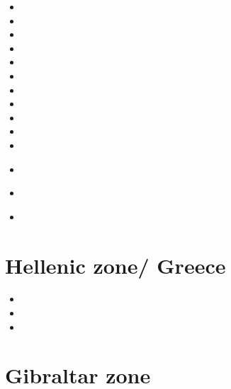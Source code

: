 \begin{scriptsize}
\begin{itemize}
\item[\nineteeneightyeight] 
\item[\nineteenninetysix] 
\item[\nineteenninetyeight] 
\item[\nineteenninetynine] 
\item[\twothousand] 
\item[\twothousandthree] 
\item[\twothousandfour] 
\item[\twothousandeight] 
\item[\twothousandnine] 
\item[\twothousandeleven] 
\item[\twothousandtwelve] 
\item[\twothousandthirteen] 
 \\ 
\item[\twothousandnineteen] 
\item[\twothousandtwenty] 
 \\ 
\end{itemize}
\end{scriptsize}

\section{Hellenic zone/ Greece}

\begin{scriptsize}
\begin{itemize}
\item[\nineteeneightyeight] 
\item[\twothousandthirteen]
\item[\twothousandfourteen]
\end{itemize}
\end{scriptsize}

\section{Gibraltar zone}

